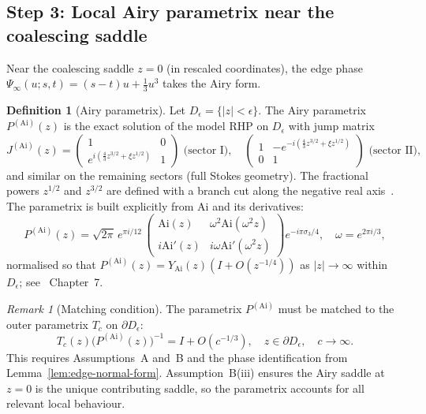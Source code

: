\documentclass[12pt,a4paper]{amsart}
\theoremstyle{definition}
\newtheorem{definition}[theorem]{Definition}
\theoremstyle{remark}
\newtheorem{remark}[theorem]{Remark}
\newcommand{\Ai}{\mathrm{Ai}}
\begin{document}
\subsection{Step 3: Local Airy parametrix near the coalescing saddle}

Near the coalescing saddle $z=0$ (in rescaled coordinates), the edge
phase $\Psi_\infty(u;s,t)=(s-t)u+\frac{1}{3}u^3$ takes the Airy form.

\begin{definition}[Airy parametrix]
\label{def:airy-parametrix}
Let $D_\epsilon=\{|z|<\epsilon\}$.
The Airy parametrix $P^{(\mathrm{Ai})}(z)$ is the exact solution
of the model RHP on $D_\epsilon$ with jump matrix
\[
  J^{(\mathrm{Ai})}(z)
  =\begin{pmatrix}1&0\\ e^{i(\frac{4}{3}z^{3/2}+\xi z^{1/2})} & 1
  \end{pmatrix}
  \text{ (sector I)},
  \quad
  \begin{pmatrix}1& -e^{-i(\frac{4}{3}z^{3/2}+\xi z^{1/2})} \\ 0 & 1
  \end{pmatrix}
  \text{ (sector II)},
\]
and similar on the remaining sectors (full Stokes geometry).
The fractional powers $z^{1/2}$ and $z^{3/2}$ are defined with a branch
cut along the negative real axis~\cite{Deift1999}.
The parametrix is built explicitly from $\Ai$ and its derivatives:
\begin{equation}\label{eq:airy-parametrix-explicit}
  P^{(\mathrm{Ai})}(z)
  =\sqrt{2\pi}\,e^{\pi i/12}\,
  \begin{pmatrix}\Ai(z) & \omega^2\Ai(\omega^2 z)\\
  i\Ai'(z) & i\omega\Ai'(\omega^2 z)\end{pmatrix}
  e^{-i\pi\sigma_3/4},
  \quad \omega=e^{2\pi i/3},
\end{equation}
normalised so that $P^{(\mathrm{Ai})}(z)=Y_{\mathrm{Ai}}(z)(I+O(z^{-1/4}))$
as $|z|\to\infty$ within $D_\epsilon$;
see~\cite{TraWid1994,Deift1999} Chapter~7.
\end{definition}

\begin{remark}[Matching condition]
\label{rem:matching}
The parametrix $P^{(\mathrm{Ai})}$ must be matched to the outer
parametrix $T_c$ on $\partial D_\epsilon$:
\begin{equation}\label{eq:matching}
  T_c(z)\bigl(P^{(\mathrm{Ai})}(z)\bigr)^{-1}
  =I+O(c^{-1/3}),\quad z\in\partial D_\epsilon,\quad c\to\infty.
\end{equation}
This requires Assumptions~A and~B and the phase identification
from Lemma~\ref{lem:edge-normal-form}.
Assumption~B(iii) ensures the Airy saddle at $z=0$ is the unique
contributing saddle, so the parametrix accounts for all relevant
local behaviour.
\end{remark}
\end{document}
